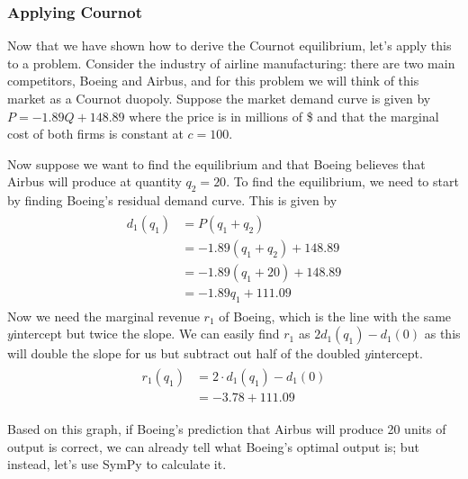 \documentclass[letterpaper,10pt,english]{jupyterBook}
\begin{document}
\subsubsection{Applying Cournot}
\label{\detokenize{content/07-game-theory/cournot:applying-cournot}}
\sphinxAtStartPar
Now that we have shown how to derive the Cournot equilibrium, let’s apply this to a problem. Consider the industry of airline manufacturing: there are two main competitors, Boeing and Airbus, and for this problem we will think of this market as a Cournot duopoly. Suppose the market demand curve is given by \(P = -1.89 Q + 148.89\) where the price is in millions of \$ and that the marginal cost of both firms is constant at \(c = 100\).

\noindent{}

\sphinxAtStartPar
Now suppose we want to find the equilibrium and that Boeing believes that Airbus will produce at quantity \(q_2 = 20\). To find the equilibrium, we need to start by finding Boeing’s residual demand curve. This is given by
\begin{equation*}
\begin{split}\begin{aligned}
d_1(q_1) &= P(q_1 + q_2) \\
&= -1.89(q_1 + q_2) + 148.89 \\
&= -1.89(q_1 + 20) + 148.89 \\
&= -1.89 q_1 + 111.09
\end{aligned}\end{split}
\end{equation*}
\sphinxAtStartPar
Now we need the marginal revenue \(r_1\) of Boeing, which is the line with the same \(y\)\sphinxhyphen{}intercept but twice the slope. We can easily find \(r_1\) as \(2 d_1(q_1) - d_1(0)\) as this will double the slope for us but subtract out half of the doubled \(y\)\sphinxhyphen{}intercept.
\begin{equation*}
\begin{split}\begin{aligned}
r_1(q_1) &= 2 \cdot d_1(q_1) - d_1(0) \\
&= -3.78 + 111.09
\end{aligned}\end{split}
\end{equation*}
\noindent{}

\sphinxAtStartPar
Based on this graph, if Boeing’s prediction that Airbus will produce 20 units of output is correct, we can already tell what Boeing’s optimal output is; but instead, let’s use SymPy to calculate it.
\end{document}
